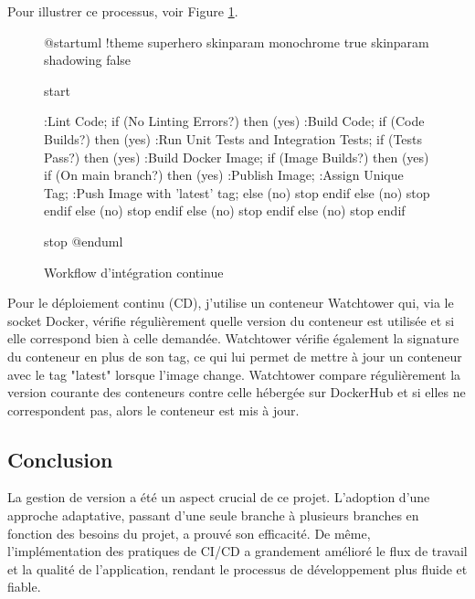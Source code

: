 Pour illustrer ce processus, voir Figure \ref{fig:ci_workflow}.

\begin{figure}[htbp]
    \centering
    \begin{plantuml}
@startuml
!theme superhero
skinparam monochrome true
skinparam shadowing false

start

:Lint Code;
if (No Linting Errors?) then (yes)
  :Build Code;
  if (Code Builds?) then (yes)
    :Run Unit Tests \n and Integration Tests;
    if (Tests Pass?) then (yes)
      :Build Docker Image;
      if (Image Builds?) then (yes)
        if (On main branch?) then (yes)
          :Publish Image;
          :Assign Unique Tag;
          :Push Image with \n 'latest' tag;
        else (no)
          stop
        endif
      else (no)
        stop
      endif
    else (no)
      stop
    endif
  else (no)
    stop
  endif
else (no)
  stop
endif

stop
@enduml
    \end{plantuml}
    \caption{Workflow d'intégration continue}
    \label{fig:ci_workflow}
\end{figure}

Pour le déploiement continu (CD), j'utilise un conteneur Watchtower qui, via le socket Docker,
vérifie régulièrement quelle version du conteneur est utilisée et si elle correspond bien à celle demandée.
Watchtower vérifie également la signature du conteneur en plus de son tag,
ce qui lui permet de mettre à jour un conteneur avec le tag "latest" lorsque l'image change.
Watchtower compare régulièrement la version courante des conteneurs contre celle hébergée sur DockerHub et si elles ne correspondent pas,
alors le conteneur est mis à jour.

\subsection{Conclusion}\label{subsec:conclusion}

La gestion de version a été un aspect crucial de ce projet.
L'adoption d'une approche adaptative, passant d'une seule branche à plusieurs branches en fonction des besoins du projet, a prouvé son efficacité.
De même, l'implémentation des pratiques de CI/CD a grandement amélioré le flux de travail et la qualité de
l'application, rendant le processus de développement plus fluide et fiable.